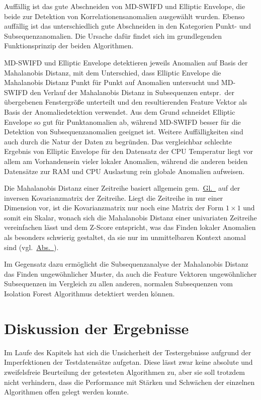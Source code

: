 Auffällig ist das gute Abschneiden von MD-SWIFD und Elliptic Envelope, die beide zur Detektion von Korrelationensanomalien ausgewählt wurden. Ebenso auffällig
ist das unterschiedlich gute Abschneiden in den Kategorien Punkt- und Subsequenzanomalien. Die Ursache dafür findet sich im grundlegenden Funktionsprinzip der
beiden Algorithmen.

MD-SWIFD und Elliptic Envelope detektieren jeweils Anomalien auf Basis der Mahalanobis Distanz, mit dem Unterschied, dass Elliptic Envelope die Mahalanobis Distanz
Punkt für Punkt auf Anomalien untersucht und MD-SWIFD den Verlauf der Mahalanobis Distanz in Subsequenzen entspr.~der übergebenen Fenstergröße unterteilt und den
resultierenden Feature Vektor als Basis der Anomaliedetektion verwendet. Aus dem Grund schneidet Elliptic Envelope so gut für Punktanomalien ab, während MD-SWIFD
besser für die Detektion von Subsequenzanomalien geeignet ist. Weitere Auffälligkeiten sind auch durch die Natur der Daten zu begründen. Das vergleichbar schlechte
Ergebnis von Elliptic Envelope für den Datensatz der CPU Temperatur liegt vor allem am Vorhandensein vieler lokaler Anomalien, während die anderen beiden
Datensätze zur RAM und CPU Auslastung rein globale Anomalien aufweisen.

Die Mahalanobis Distanz einer Zeitreihe basiert allgemein gem.~\hyperref[eq:mahalanobis_dist]{Gl.~} auf der inversen Kovarianzmatrix der
Zeitreihe. Liegt die Zeitreihe in nur einer Dimension vor, ist die Kovarianzmatrix nur noch eine Matrix der Form $1\times 1$ und somit ein Skalar, wonach sich die
Mahalanobis Distanz einer univariaten Zeitreihe vereinfachen lässt und dem Z-Score entspricht, was das Finden lokaler Anomalien als besonders schwierig gestaltet,
da sie nur im unmittelbaren Kontext anomal sind (vgl.~\hyperref[sec:punktanomalien]{Abs.~}).

Im Gegensatz dazu ermöglicht die Subsequenzanalyse der Mahalanobis Distanz das Finden ungewöhnlicher Muster, da auch die Feature Vektoren ungewöhnlicher Subsequenzen
im Vergleich zu allen anderen, normalen Subsequenzen vom Isolation Forest Algorithmus detektiert werden können.

\clearpage
\section{Diskussion der Ergebnisse}
Im Laufe des Kapitels hat sich die Unsicherheit der Testergebnisse aufgrund der Imperfektionen der Testdatensätze aufgetan. Diese lässt zwar keine absolute und
zweifelsfreie Beurteilung der getesteten Algorithmen zu, aber sie soll trotzdem nicht verhindern, dass die Performance mit Stärken und Schwächen der einzelnen
Algorithmen offen gelegt werden konnte.